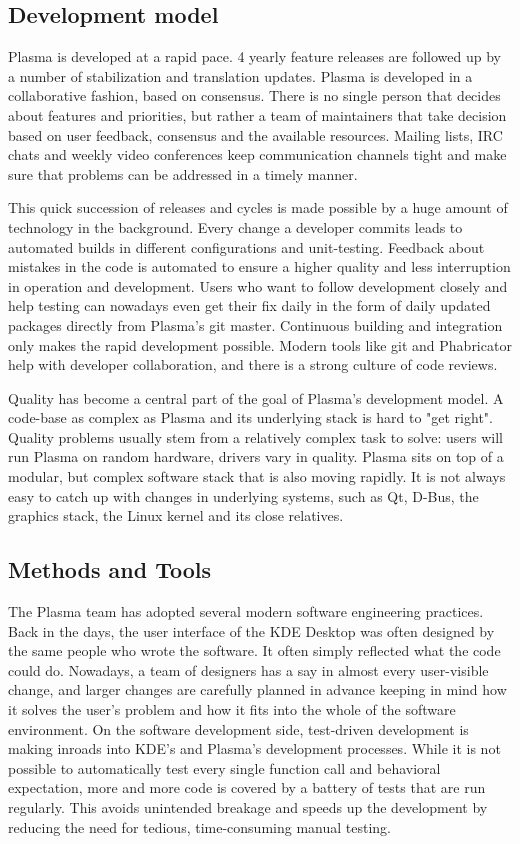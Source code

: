 \subsection*{Development model}

Plasma is developed at a rapid pace. 4 yearly feature releases are followed up by a number of stabilization and translation updates.
Plasma is developed in a collaborative fashion, based on consensus. There is no single person that decides about features and priorities, but rather a team of maintainers that take decision based on user feedback, consensus and the available resources. Mailing lists, IRC chats and weekly video conferences keep communication channels tight and make sure that problems can be addressed in a timely manner.

This quick succession of releases and cycles is made possible by a huge amount of technology in the background. Every change a developer commits leads to automated builds in different configurations and unit-testing. Feedback about mistakes in the code is automated to ensure a higher quality and less interruption in operation and development. Users who want to follow development closely and help testing can nowadays even get their fix daily in the form of daily updated packages directly from Plasma's git master. Continuous building and integration only makes the rapid development possible.
Modern tools like git and Phabricator help with developer collaboration, and there is a strong culture of code reviews.

Quality has become a central part of the goal of Plasma's development model. A code-base as complex as Plasma and its underlying stack is hard to "get right". Quality problems usually stem from a relatively complex task to solve: users will run Plasma on random hardware, drivers vary in quality. Plasma sits on top of a modular, but complex software stack that is also moving rapidly. It is not always easy to catch up with changes in underlying systems, such as Qt, D-Bus, the graphics stack, the Linux kernel and its close relatives.

\subsection*{Methods and Tools}

The Plasma team has adopted several modern software engineering practices. Back in the days, the user interface of the KDE Desktop was often designed by the same people who wrote the software. It often simply reflected what the code could do. Nowadays, a team of designers has a say in almost every user-visible change, and larger changes are carefully planned in advance keeping in mind how it solves the user's problem and how it fits into the whole of the software environment.
On the software development side, test-driven development is making inroads into KDE's and Plasma's development processes. While it is not possible to automatically test every single function call and behavioral expectation, more and more code is covered by a battery of tests that are run regularly. This avoids unintended breakage and speeds up the development by reducing the need for tedious, time-consuming manual testing.

